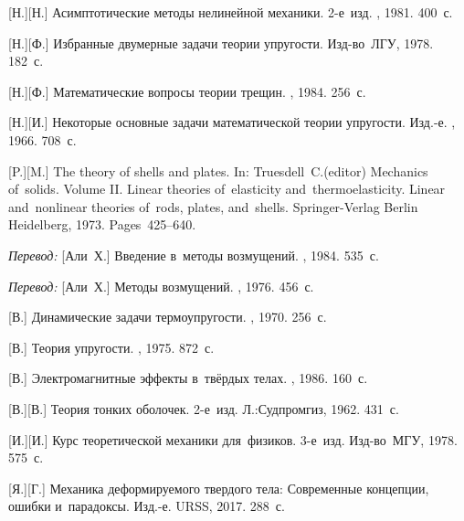 \begin{thebibliography}{123}
\begin{otherlanguage}{russian}
[Н.][Н.] Асимптотические методы нелинейной механики. 2\hbox{-}е~изд. \naukapublisher, 1981. 400~с.

[Н.][Ф.] Избранные двумерные задачи теории упругости. Изд\hbox{-}во~ЛГУ, 1978. 182~с.

[Н.][Ф.] Математические вопросы теории трещин. \naukapublisher, 1984. 256~с.

[Н.][И.] Некоторые основные задачи математической теории упругости. Изд.\hbox{-}е. \naukapublisher, 1966. 708~с.

[P.][M.] The theory of shells and plates. In: Truesdell~C.\:(editor) Mechanics of~solids. Volume II. Linear theories of~elasticity and~thermoelasticity. Linear and~nonlinear theories of~rods, plates, and~shells. Springer\hbox{-}Verlag Berlin Heidelberg, 1973. Pages~425\hbox{--}640.

\emph{Перевод:} [Али~Х.] Введение в~методы возмущений. \mirpublisher, 1984. 535~с.

\emph{Перевод:} [Али~Х.] Методы возмущений. \mirpublisher, 1976. 456~с.

[В.] Динамические задачи термоупругости. \mirpublisher, 1970. 256~с.

[В.] Теория упругости. \mirpublisher, 1975. 872~с.

[В.] Электромагнитные эффекты в~твёрдых телах. \mirpublisher, 1986. 160~с.

[В.][В.] Теория тонких оболочек. 2\hbox{-}е~изд. Л.:\;Судпромгиз, 1962. 431~с.

[И.][И.] Курс теоретической механики для~физиков. 3\hbox{-}е~изд. Изд\hbox{-}во~МГУ, 1978. 575~с.

[Я.][Г.] Механика деформируемого твердого тела: Современные концепции, ошибки и~парадоксы. Изд.\hbox{-}е. URSS, 2017. 288~с. 


\end{otherlanguage}
\end{thebibliography}
